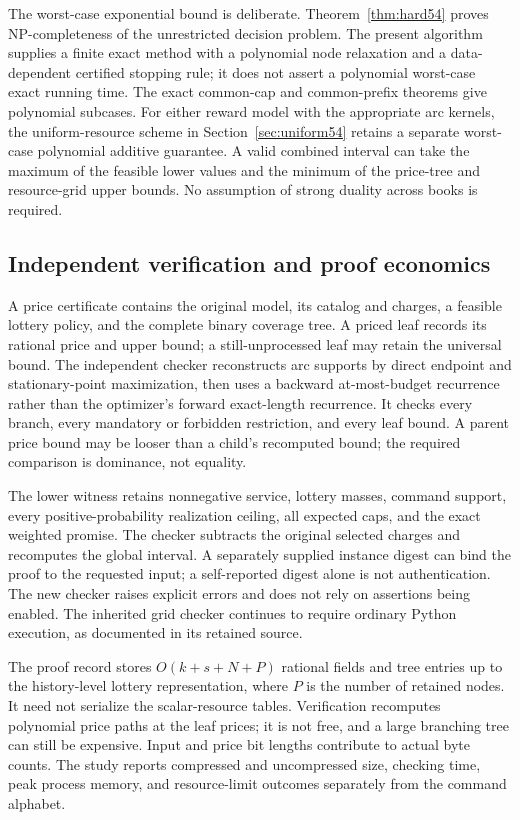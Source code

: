 The worst-case exponential bound is deliberate. Theorem~\ref{thm:hard54} proves NP-completeness of the unrestricted decision problem. The present algorithm supplies a finite exact method with a polynomial node relaxation and a data-dependent certified stopping rule; it does not assert a polynomial worst-case exact running time. The exact common-cap and common-prefix theorems give polynomial subcases. For either reward model with the appropriate arc kernels, the uniform-resource scheme in Section~\ref{sec:uniform54} retains a separate worst-case polynomial additive guarantee. A valid combined interval can take the maximum of the feasible lower values and the minimum of the price-tree and resource-grid upper bounds. No assumption of strong duality across books is required.

\subsection{Independent verification and proof economics}
A price certificate contains the original model, its catalog and charges, a feasible lottery policy, and the complete binary coverage tree. A priced leaf records its rational price and upper bound; a still-unprocessed leaf may retain the universal bound. The independent checker reconstructs arc supports by direct endpoint and stationary-point maximization, then uses a backward at-most-budget recurrence rather than the optimizer's forward exact-length recurrence. It checks every branch, every mandatory or forbidden restriction, and every leaf bound. A parent price bound may be looser than a child's recomputed bound; the required comparison is dominance, not equality.

The lower witness retains nonnegative service, lottery masses, command support, every positive-probability realization ceiling, all expected caps, and the exact weighted promise. The checker subtracts the original selected charges and recomputes the global interval. A separately supplied instance digest can bind the proof to the requested input; a self-reported digest alone is not authentication. The new checker raises explicit errors and does not rely on assertions being enabled. The inherited grid checker continues to require ordinary Python execution, as documented in its retained source.

The proof record stores $O(k+s+N+P)$ rational fields and tree entries up to the history-level lottery representation, where $P$ is the number of retained nodes. It need not serialize the scalar-resource tables. Verification recomputes polynomial price paths at the leaf prices; it is not free, and a large branching tree can still be expensive. Input and price bit lengths contribute to actual byte counts. The study reports compressed and uncompressed size, checking time, peak process memory, and resource-limit outcomes separately from the command alphabet.

